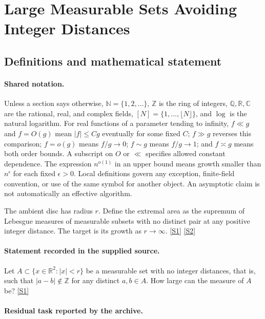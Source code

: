\documentclass[11pt,a4paper]{article}
\newcommand{\N}{\mathbb{N}}
\newcommand{\Z}{\mathbb{Z}}
\newcommand{\Q}{\mathbb{Q}}
\newcommand{\R}{\mathbb{R}}
\newcommand{\C}{\mathbb{C}}
\newcommand{\sref}[2]{\hyperlink{source:#1:#2}{[S#2]}}
\begin{document}
\section{Large Measurable Sets Avoiding Integer Distances}\label{statement}


\subsection{Definitions and mathematical statement}

\paragraph{Shared notation.}Unless a section says otherwise, $\N=\{1,2,\ldots\}$,
$\Z$ is the ring of integers, $\Q,\R,\C$ are the rational, real, and complex
fields, $[N]=\{1,\ldots,\lfloor N\rfloor\}$, and $\log$ is the natural
logarithm. For real functions of a parameter tending to infinity,
$f\ll g$ and $f=O(g)$ mean $|f|\leq Cg$ eventually for some fixed $C$;
$f\gg g$ reverses this comparison; $f=o(g)$ means $f/g\to0$;
$f\sim g$ means $f/g\to1$; and $f\asymp g$ means both order bounds.
A subscript on $O$ or $\ll$ specifies allowed constant dependence.
The expression $n^{o(1)}$ in an upper bound means growth smaller than
$n^\epsilon$ for each fixed $\epsilon>0$. Local definitions govern any
exception, finite-field convention, or use of the same symbol for another
object. An asymptotic claim is not automatically an effective algorithm.



The ambient disc has radius $r$. Define the extremal area as the supremum of Lebesgue measures of measurable subsets with no distinct pair at any positive integer distance. The target is its growth as $r\to\infty$. \sref{statement}{1} \sref{statement}{2}

\paragraph{Statement recorded in the supplied source.}
Let $A\subset \{ x\in \mathbb{R}^2 : \lvert x\rvert <r\}$ be a measurable set with no integer distances, that is, such that $\lvert a-b\rvert \not\in \mathbb{Z}$ for any distinct $a,b\in A$. How large can the measure of $A$ be? \sref{statement}{1}

\paragraph{Residual task reported by the archive.}
\end{document}
